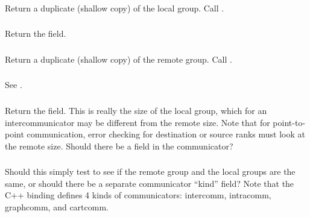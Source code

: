 \documentclass{article}
\begin{document}
\subsubsection{}
\begin{adi3}Return a duplicate (shallow copy) of the local group.  Call
  . 
\end{adi3}

\subsubsection{}
Return the  field.

\subsubsection{}
\begin{adi3}Return a duplicate (shallow copy) of the remote group.  Call
  . 
\end{adi3}

\subsubsection{}
See .

\subsubsection{}
Return the  field.  This is really the size of the local
group, which for an intercommunicator may be different from the remote
size.  Note that for point-to-point communication, error checking for
destination or source ranks must look at the remote size.  Should
there be a  field in the communicator?

\subsubsection{}

\subsubsection{}
Should this simply test to see if the remote group and the local groups are
the same, or should there be a separate communicator ``kind'' field?  Note
that the C++ binding defines 4 kinds of communicators: intercomm, intracomm,
graphcomm, and cartcomm. 
\end{document}
